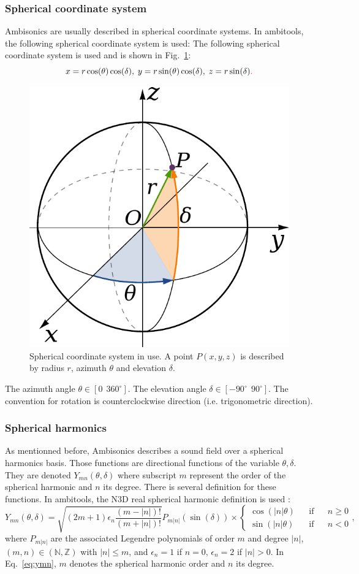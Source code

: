 \documentclass[10pt,a4paper]{article}
\begin{document}
\subsubsection{Spherical coordinate system}
\label{sec:spherical_coordinates}
Ambisonics are usually described in spherical coordinate systems. In ambitools, the following spherical coordinate system is used:
The following spherical coordinate system is used and is shown in Fig.~\ref{fig:coord_sph}:
\begin{equation}
x = r \cos(\theta) \cos(\delta), \; y = r \sin(\theta) \cos(\delta), \;
z = r \sin(\delta)\textcolor{red}{.}
\end{equation}
\begin{figure}[ht]
\centering
\includegraphics[height=0.3\columnwidth]{Fig_Coord_Sph.pdf}
\caption{Spherical coordinate system in use. A point $P (x,y,z)$ is described by radius $r$, azimuth $\theta$ and elevation $\delta$.}
\label{fig:coord_sph}
\end{figure}
The azimuth angle $\theta \in [0~~360^\circ]$. The elevation angle $\delta \in [-90^\circ~~90^\circ]$. The convention for rotation is counterclockwise direction (i.e. trigonometric direction).

\subsubsection{Spherical harmonics}
As mentionned before, Ambisonics describes a sound field over a spherical harmonics basis. Those functions are directional functions of the variable $\theta,\delta$. They are denoted $Y_{mn}(\theta,\delta)$ where subscript $m$ represent the order of the spherical harmonic and $n$ its degree. There is several definition for these functions. In ambitools, the N3D real spherical harmonic definition is used \cite{daniel2000representation}:
\begin{equation}
Y_{mn}(\theta,\delta) = \sqrt{(2m+1)\epsilon_n \frac{(m-|n|)!}{(m+|n|)!}} P_{m|n|}(\sin(\delta))
 \times \left\lbrace \begin{aligned} \cos(|n| \theta) & & \text{if} & & n \geq 0 \\ \sin(|n| \theta)  & & \text{if} & & n < 0  \end{aligned} \right.,
\label{eq:ymn}
\end{equation}
where $P_{m|n|}$ are the associated Legendre polynomials of order $m$ and degree $|n|$, $(m,n) \in (\mathbb{N},\mathbb{Z})$ with $|n| \leq m$, and $\epsilon_n = 1$ if $n = 0$, $\epsilon_n = 2$ if $|n| > 0$. In Eq.~\eqref{eq:ymn}, $m$ denotes the spherical harmonic order and $n$ its degree.
\end{document}
